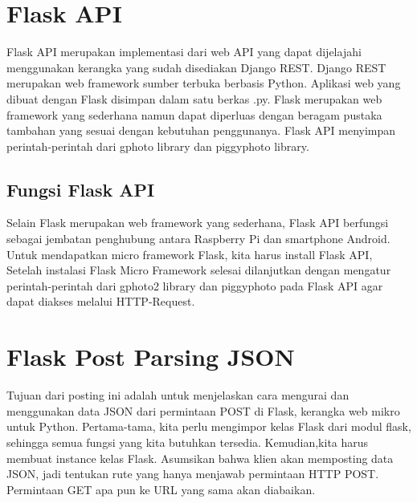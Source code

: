 \section{Flask API}
Flask API merupakan implementasi dari web API yang dapat dijelajahi menggunakan kerangka yang sudah disediakan Django REST. Django REST merupakan web framework sumber terbuka berbasis Python. Aplikasi web yang dibuat dengan Flask disimpan dalam satu berkas .py. Flask merupakan web framework yang sederhana namun dapat diperluas dengan beragam pustaka tambahan yang sesuai dengan kebutuhan penggunanya. Flask API menyimpan perintah-perintah dari gphoto library dan piggyphoto library\cite{computingaplikasi}.

\subsection{Fungsi Flask API}
Selain Flask merupakan web framework yang sederhana, Flask API berfungsi sebagai jembatan penghubung antara Raspberry Pi dan smartphone Android. Untuk mendapatkan micro framework Flask, kita harus install Flask API, Setelah instalasi Flask Micro Framework selesai dilanjutkan dengan mengatur perintah-perintah dari gphoto2 library dan piggyphoto pada Flask API agar dapat diakses melalui HTTP-Request\cite{computingaplikasi}.

\section{Flask Post Parsing JSON}
Tujuan dari posting ini adalah untuk menjelaskan cara mengurai dan menggunakan data JSON dari permintaan POST di Flask, kerangka web mikro untuk Python. Pertama-tama, kita perlu mengimpor kelas Flask dari modul flask, sehingga semua fungsi yang kita butuhkan tersedia. Kemudian,kita harus membuat instance kelas Flask. Asumsikan bahwa klien akan memposting data JSON, jadi tentukan rute yang hanya menjawab permintaan HTTP POST. Permintaan GET apa pun ke URL yang sama akan diabaikan\cite{dwyer2016flask}.

